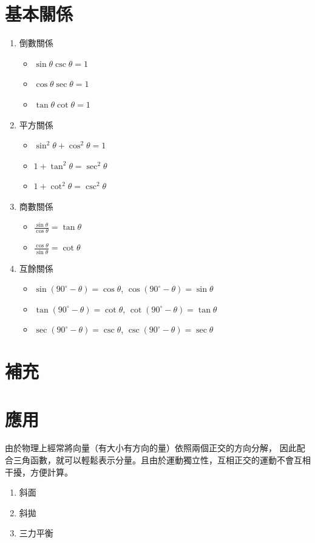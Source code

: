 \documentclass[cn,10pt,math=newtx,chinesefont=founder]{elegantbook}
\begin{document}
\section{基本關係}
\begin{enumerate}
    \item 倒數關係
    \begin{itemize}
        \item $\sin \theta \csc \theta = 1$
        \item $\cos \theta \sec \theta = 1$
        \item $\tan \theta \cot \theta = 1$
    \end{itemize}
    \item 平方關係
    \begin{itemize}
        \item $\sin^2 \theta + \cos^2 \theta = 1 $        
        \item $ 1 + \tan^2 \theta = \sec^2 \theta$
        \item $ 1 + \cot^2 \theta = \csc^2 \theta $
    \end{itemize}
    \item 商數關係
    \begin{itemize}
        \itemsep = 8pt
        \item $\frac{\sin \theta}{\cos \theta}= \tan \theta$
        \item $\frac{\cos \theta}{\sin \theta}= \cot \theta$
    \end{itemize}
    \item 互餘關係
    \begin{itemize}
        \item $\sin (90^\circ - \theta) = \cos \theta$, $\cos (90^\circ - \theta) = \sin \theta$
        \item $\tan (90^\circ - \theta) = \cot \theta$, $\cot (90^\circ - \theta) = \tan \theta$
        \item $\sec (90^\circ - \theta) = \csc \theta$, $\csc (90^\circ - \theta) = \sec \theta$
    \end{itemize}


\end{enumerate}

\section{補充}
\newpage

\section{應用}
由於物理上經常將向量（有大小有方向的量）依照兩個正交的方向分解，
因此配合三角函數，就可以輕鬆表示分量。且由於運動獨立性，互相正交的運動不會互相干擾，方便計算。
\begin{enumerate}
    \itemsep = 20em
    \item 斜面
    \item 斜拋
    \item 三力平衡
\end{enumerate}
\newpage
\end{document}
